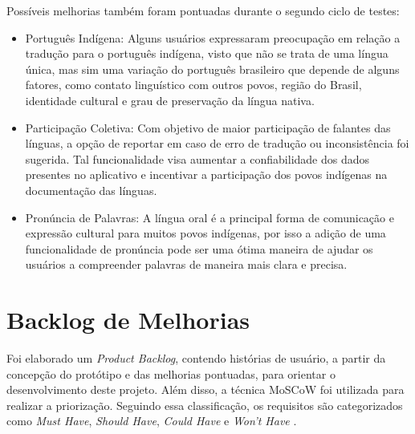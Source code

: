 Possíveis melhorias também foram pontuadas durante o segundo ciclo de testes:

\begin{itemize}
	\item Português Indígena: Alguns usuários expressaram preocupação em relação a tradução para o português indígena, visto que não se trata de uma língua única, mas sim uma variação do português brasileiro que depende de alguns fatores, como contato linguístico com outros 
	povos, região do Brasil, identidade cultural e grau de preservação da língua nativa.
	\item Participação Coletiva: Com objetivo de maior participação de falantes das línguas, a opção de reportar em caso de erro de tradução ou inconsistência foi sugerida. Tal funcionalidade visa aumentar a confiabilidade dos dados presentes no aplicativo e incentivar a 
	participação dos povos indígenas na documentação das línguas.
	\item Pronúncia de Palavras: A língua oral é a principal forma de comunicação e expressão cultural para muitos povos indígenas, por isso a adição de uma funcionalidade de pronúncia pode ser uma ótima maneira de ajudar os usuários a compreender palavras de maneira mais clara 
	e precisa.
\end{itemize}

\section{Backlog de Melhorias}
\label{sec:Backlog de Melhorias}
Foi elaborado um \textit{Product Backlog}, contendo histórias de usuário, a partir da concepção do protótipo e das melhorias pontuadas, para orientar o desenvolvimento deste projeto. Além disso, a técnica MoSCoW foi utilizada para realizar a priorização. Seguindo essa classificação, 
os requisitos são categorizados como \textit{Must Have}, \textit{Should Have}, \textit{Could Have} e \textit{Won't Have} \cite{miranda2021}. 



